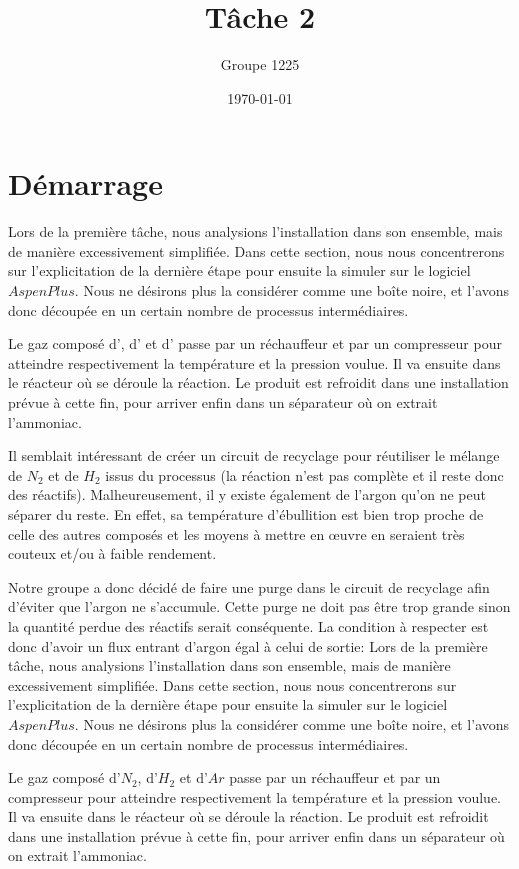 \documentclass[a4paper, oneside, 12pt]{article}
\title{Tâche 2}
\author{Groupe 1225}
\date{\today}
\begin{document}
\maketitle

\section{Démarrage}

Lors de la première tâche, nous analysions l'installation dans son ensemble, 
mais de manière excessivement simplifiée. 
Dans cette section, nous nous concentrerons sur l'explicitation de la dernière étape 
pour ensuite la simuler sur le logiciel $Aspen Plus$. 
Nous ne désirons plus la considérer comme une boîte noire, et l'avons donc découpée 
en un certain nombre de processus intermédiaires. 

Le gaz composé d', d' et d' passe par un réchauffeur et par un compresseur 
pour atteindre respectivement la température et la pression voulue. 
Il va ensuite dans le réacteur où se déroule la réaction.
Le produit est refroidit dans une installation prévue à cette fin, 
pour arriver enfin dans un séparateur où on extrait l'ammoniac.

Il semblait intéressant de créer un circuit de recyclage pour réutiliser 
le mélange de $N_2$ et de $H_2$ issus du processus (la réaction n'est pas complète 
et il reste donc des réactifs). Malheureusement, il y existe également de l'argon 
qu'on ne peut séparer du reste. En effet, sa température d'ébullition est bien trop 
proche de celle des autres composés et les moyens à mettre en œuvre en seraient 
très couteux et/ou à faible rendement.

Notre groupe a donc décidé de faire une purge dans le circuit de recyclage 
afin d'éviter que l'argon ne s'accumule. Cette purge ne doit pas être trop 
grande sinon la quantité perdue des réactifs serait conséquente. 
La condition à respecter est donc d'avoir un flux entrant d'argon égal à celui de sortie:
Lors de la première tâche, nous analysions l'installation dans son ensemble, 
mais de manière excessivement simplifiée. Dans cette section, 
nous nous concentrerons sur l'explicitation de la dernière étape pour 
ensuite la simuler sur le logiciel $Aspen Plus$. 
Nous ne désirons plus la considérer comme une boîte noire, 
et l'avons donc découpée en un certain nombre de processus intermédiaires.

Le gaz composé d'$N_2$, d'$H_2$ et d'$Ar$ passe par un réchauffeur et 
par un compresseur pour atteindre respectivement la température et la pression voulue. 
Il va ensuite dans le réacteur où se déroule la réaction. 
Le produit est refroidit dans une installation prévue à cette fin, 
pour arriver enfin dans un séparateur où on extrait l'ammoniac. 
\end{document}
